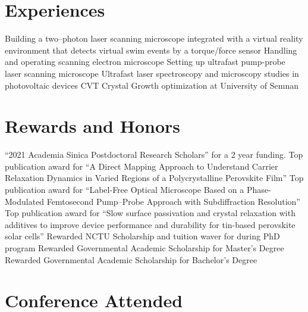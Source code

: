 \documentclass[11pt,a4paper, nolmodern]{moderncv}
\begin{document}
\section{Experiences}
		{Building a two--photon laser scanning microscope integrated with a virtual reality environment 
		that detects virtual swim events by a torque/force sensor}
		{Handling and operating scanning electron microscope}
		{Setting up ultrafast pump-probe laser scanning microscope}
		{Ultrafast laser spectroscopy and microscopy
	studies in photovoltaic devices }
		{CVT Crystal Growth optimization at University of Semnan}
\section{Rewards and Honors}
		{``2021 Academia Sinica Postdoctoral 
		Research Scholars'' for a 2 year funding.}
		{Top publication award for ``A Direct Mapping 
		Approach to Understand Carrier Relaxation 
		Dynamics in Varied Regions of a 
		Polycrystalline Perovskite Film''}
		{Top publication award for ``Label-Free Optical 
		Microscope Based on a Phase-Modulated Femtosecond 
		Pump–Probe Approach with Subdiffraction Resolution''}
		{Top publication award for ``Slow surface 
		passivation and crystal relaxation with additives to 
		improve device performance and durability for tin-based 
		perovskite solar cells''}
		{Rewarded NCTU Scholarship and tuition waver 
		for during PhD program}
		{Rewarded Governmental Academic Scholarship 
		for Master's Degree}
		{Rewarded Governmental Academic Scholarship 
		for Bachelor's Degree}
\section{Conference Attended}
\end{document}
